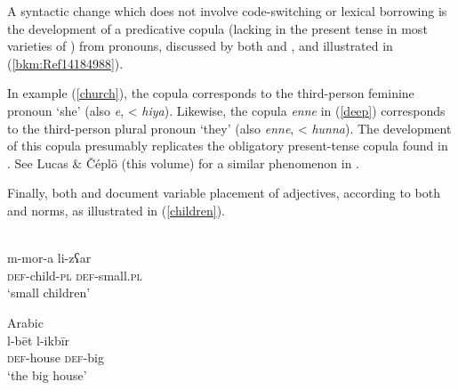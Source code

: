 \documentclass[output=paper]{langsci/langscibook}
\begin{document}
A syntactic change which does not involve {code-switching} or lexical borrowing is the development of a predicative {copula} (lacking in the present {tense} in most varieties of ) from  pronouns, discussed by both \citet{Roth2004} and \citet{Borg1985}, and illustrated in (\ref{bkm:Ref14184988}).




In example (\ref{church}), the {copula} corresponds to the third-person feminine pronoun ‘she’ (also \textit{e}, < \textit{hiya}). Likewise, the {copula} \textit{enne} in (\ref{deep}) corresponds to the third-person plural pronoun ‘they’ (also \textit{enne}, < \textit{hunna}). The development of this {copula} presumably replicates the obligatory present-{tense} {copula} found in . See Lucas \& Čéplö (this volume) for a similar phenomenon in .

Finally, both \citet{Roth2004} and \citet{Newton1964} document variable placement of adjectives, according to both  and  norms, as illustrated in (\ref{children}).


\ea\label{children}
 {\citealt[72]{Roth2004}}\\
\gll m-mor-a li-zʕar\\
     \textsc{def}-child-\textsc{pl} \textsc{def}-small.\textsc{pl}  \\
\glt ‘small children’

\ex
{} Arabic{} {\citealt[48]{Newton1964}}\\
\gll l-bēt l-ikbīr\\
     \textsc{def}-house \textsc{def}-big  \\
\glt ‘the big house’
\end{document}
